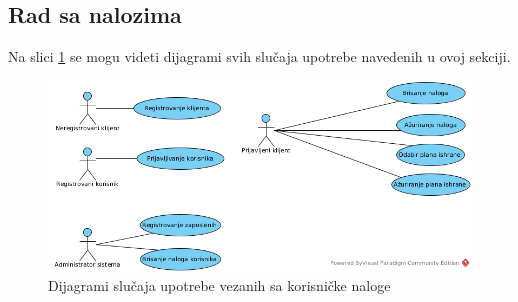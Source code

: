 \subsection{Rad sa nalozima}

Na slici \ref{fig:UCUserAccounts} se mogu videti dijagrami svih slučaja upotrebe navedenih u ovoj sekciji.

\begin{figure}[H]
\begin{center}
\includegraphics[width=\textwidth]{Pictures/uc_user_accounts.png}
\end{center}
    \caption{Dijagrami slučaja upotrebe vezanih sa korisničke naloge}
\label{fig:UCUserAccounts}
\end{figure}











